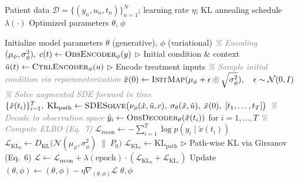 \usepackage{algorithm}
\usepackage{algorithmic}

\begin{algorithm}[t]
\caption{Training the Latent SDE Model}
\label{alg:training}
\begin{algorithmic}[1]
\REQUIRE Patient data $\mathcal{D} = \{(y_n, u_n, t_n)\}_{n=1}^{N}$; learning rate $\eta$; KL annealing schedule $\lambda(\cdot)$
\ENSURE Optimized parameters $\theta$, $\phi$

\STATE Initialize model parameters $\theta$ (generative), $\phi$ (variational)
        \STATE \textit{\textcolor{gray}{\% Encoding}}
        \STATE $(\mu_\phi, \sigma^2_\phi), \; c(t) \leftarrow \textsc{ObsEncoder}_\phi(y)$ \hfill $\triangleright$ Initial condition \& context
        \STATE $\tilde{u}(t) \leftarrow \textsc{CtrlEncoder}_\phi(u)$ \hfill $\triangleright$ Encode treatment inputs
        \STATE \textit{\textcolor{gray}{\% Sample initial condition via reparameterization}}
        \STATE $\tilde{x}(0) \leftarrow \textsc{InitMap}(\mu_\phi + \epsilon \odot \sqrt{\sigma^2_\phi}), \quad \epsilon \sim \mathcal{N}(0, I)$
        \STATE \textit{\textcolor{gray}{\% Solve augmented SDE forward in time}}
        \STATE $\{\tilde{x}(t_i)\}_{i=1}^{T}, \; \text{KL}_{\text{path}} \leftarrow \textsc{SDESolve}\big(\nu_\phi(\tilde{x}, \tilde{u}, c), \; \sigma_\theta(\tilde{x}, \tilde{u}), \; \tilde{x}(0), \; [t_1, \ldots, t_T]\big)$
        \STATE \textit{\textcolor{gray}{\% Decode to observation space}}
        \STATE $\hat{y}_i \leftarrow \textsc{ObsDecoder}_\theta(\tilde{x}(t_i))$ for $i = 1, \ldots, T$
        \STATE \textit{\textcolor{gray}{\% Compute ELBO (Eq.~7)}}
        \STATE $\mathcal{L}_{\text{recon}} \leftarrow -\sum_{i=1}^{T} \log p(y_i \mid \tilde{x}(t_i))$
        \STATE $\mathcal{L}_{\text{KL}_0} \leftarrow D_{\text{KL}}\big(\mathcal{N}(\mu_\phi, \sigma^2_\phi) \;\|\; P_0\big)$
        \STATE $\mathcal{L}_{\text{KL}_\tau} \leftarrow \text{KL}_{\text{path}}$ \hfill $\triangleright$ Path-wise KL via Girsanov (Eq.~6)
        \STATE $\mathcal{L} \leftarrow \mathcal{L}_{\text{recon}} + \lambda(\text{epoch}) \cdot (\mathcal{L}_{\text{KL}_0} + \mathcal{L}_{\text{KL}_\tau})$
        \STATE Update $(\theta, \phi) \leftarrow (\theta, \phi) - \eta \nabla_{(\theta,\phi)} \mathcal{L}$
    \ENDFOR
\ENDFOR
\RETURN $\theta, \phi$
\end{algorithmic}
\end{algorithm}